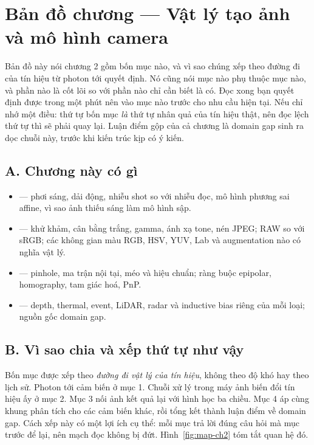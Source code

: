 \documentclass[../../deep_learning.tex]{subfiles}
\begin{document}
\section*{Bản đồ chương --- Vật lý tạo ảnh và mô hình camera}

\begin{tomtat}
Bản đồ này nói chương 2 gồm bốn mục nào, và vì sao chúng xếp theo đường đi của tín hiệu từ photon tới quyết định. Nó cũng nói mục nào phụ thuộc mục nào, và phần nào là cốt lõi so với phần nào chỉ cần biết là có. Đọc xong bạn quyết định được trong một phút nên vào mục nào trước cho nhu cầu hiện tại. Nếu chỉ nhớ một điều: thứ tự bốn mục \emph{là} thứ tự nhân quả của tín hiệu thật, nên đọc lệch thứ tự thì sẽ phải quay lại. Luận điểm gộp của cả chương là domain gap sinh ra dọc chuỗi này, trước khi kiến trúc kịp có ý kiến.
\end{tomtat}

\subsection*{A. Chương này có gì}

\begin{itemize}
\item \textbf{} --- phơi sáng, dải động, nhiễu shot so với nhiễu đọc, mô hình phương sai affine, vì sao ảnh thiếu sáng làm mô hình sập.
\item \textbf{} --- khử khảm, cân bằng trắng, gamma, ánh xạ tone, nén JPEG; RAW so với sRGB; các không gian màu RGB, HSV, YUV, Lab và augmentation nào có nghĩa vật lý.
\item \textbf{} --- pinhole, ma trận nội tại, méo và hiệu chuẩn; ràng buộc epipolar, homography, tam giác hoá, PnP.
\item \textbf{} --- depth, thermal, event, LiDAR, radar và inductive bias riêng của mỗi loại; nguồn gốc domain gap.
\end{itemize}

\subsection*{B. Vì sao chia và xếp thứ tự như vậy}
Bốn mục được xếp theo \emph{đường đi vật lý của tín hiệu}, không theo độ khó hay theo lịch sử. Photon tới cảm biến ở mục 1. Chuỗi xử lý trong máy ảnh biến đổi tín hiệu ấy ở mục 2. Mục 3 nối ảnh kết quả lại với hình học ba chiều. Mục 4 áp cùng khung phân tích cho các cảm biến khác, rồi tổng kết thành luận điểm về domain gap. Cách xếp này có một lợi ích cụ thể: mỗi mục trả lời đúng câu hỏi mà mục trước để lại, nên mạch đọc không bị đứt. Hình~\ref{fig:map-ch2} tóm tắt quan hệ đó.
\end{document}
